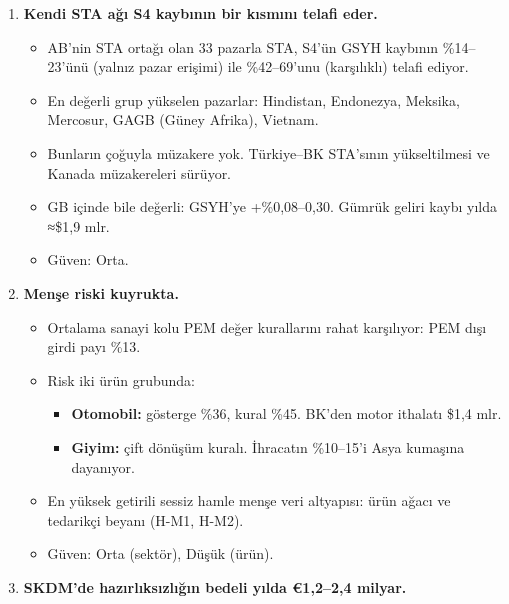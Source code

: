 \begin{enumerate}
  \begin{itemize}
  \tightlist
  \item
    Net rezerv (IMF şablonu) \$41,6 mlr. Kurallı bir çıkış ilanı için \$68 mlr, düzensiz senaryo için \$110 mlr gerekiyor.
  \item
    T2028 bu kapıdan geçmiyor. T2029 ancak Mart--Ağustos 2026'daki gibi güçlü girişlerle ve kurallı bir ilanla geçiyor.
  \item
    Kurdaki \%10'luk artış TÜFE'yi ≈250 bp yükseltir; bu, TÜFE kısıtının sekiz katı. Rezerv tamponu TÜFE kısıtının ön şartı.
  \item
    \etiketT{} Güven: Düşük--Orta.
  \end{itemize}
\item
  \textbf{Kendi STA ağı S4 kaybının bir kısmını telafi eder.}

  \begin{itemize}
  \tightlist
  \item
    AB'nin STA ortağı olan 33 pazarla STA, S4'ün GSYH kaybının \%14--23'ünü (yalnız pazar erişimi) ile \%42--69'unu (karşılıklı) telafi ediyor.
  \item
    En değerli grup yükselen pazarlar: Hindistan, Endonezya, Meksika, Mercosur, GAGB (Güney Afrika), Vietnam.
  \item
    Bunların çoğuyla müzakere yok. Türkiye--BK STA'sının yükseltilmesi ve Kanada müzakereleri sürüyor.
  \item
    GB içinde bile değerli: GSYH'ye +\%0,08--0,30. Gümrük geliri kaybı yılda ≈\$1,9 mlr.
  \item
    \etiketT{} Güven: Orta.
  \end{itemize}
\item
  \textbf{Menşe riski kuyrukta.}

  \begin{itemize}
  \tightlist
  \item
    Ortalama sanayi kolu PEM değer kurallarını rahat karşılıyor: PEM dışı girdi payı \%13.
  \item
    Risk iki ürün grubunda:

    \begin{itemize}
    \tightlist
    \item
      \textbf{Otomobil:} gösterge \%36, kural \%45. BK'den motor ithalatı \$1,4 mlr.
    \item
      \textbf{Giyim:} çift dönüşüm kuralı. İhracatın \%10--15'i Asya kumaşına dayanıyor.
    \end{itemize}
  \item
    En yüksek getirili sessiz hamle menşe veri altyapısı: ürün ağacı ve tedarikçi beyanı (H-M1, H-M2).
  \item
    \etiketT{} Güven: Orta (sektör), Düşük (ürün).
  \end{itemize}
\item
  \textbf{SKDM'de hazırlıksızlığın bedeli yılda €1,2--2,4 milyar.}


\end{enumerate}
